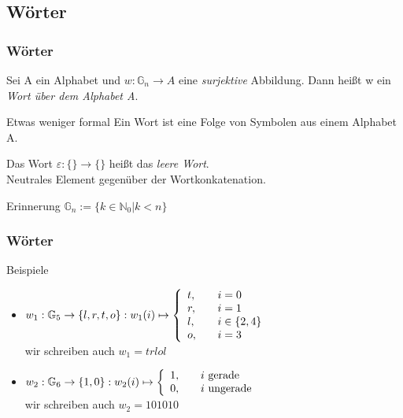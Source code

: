 \subsection{Wörter}
\begin{frame}
  \frametitle{Wörter}
  \begin{definition}
    Sei A ein Alphabet und $w: \mathbb{G}_n \rightarrow A$ eine \emph{surjektive} Abbildung. Dann heißt w ein \emph{Wort über dem Alphabet A}.
  \end{definition}\pause
  \begin{alertblock}{Etwas weniger formal}
    Ein Wort ist eine Folge von Symbolen aus einem Alphabet A.
  \end{alertblock}\pause
  \begin{definition}
    Das Wort $\varepsilon: \{\} \rightarrow \{\}$ heißt das \emph{leere Wort}. \\
    {\tiny Neutrales Element gegenüber der Wortkonkatenation.}
  \end{definition}\pause
  \begin{alertblock}{Erinnerung}
    $\mathbb{G}_n :=  \{k \in \mathbb{N}_0 | k < n\}$
  \end{alertblock}
\end{frame}
\begin{frame}
  \frametitle{Wörter}
  \begin{exampleblock}{Beispiele}
    \begin{itemize}
      \item
      $
        w_1: \mathbb{G}_5 \rightarrow \{l, r, t, o\}: w_1(i) \mapsto \left\{
        \begin{array}{l l}
          t, & \quad i = 0\\
          r, & \quad i = 1\\
          l, & \quad i \in \{2, 4\}\\
          o, & \quad i = 3\\
        \end{array} \right.
      $ \\
      wir schreiben auch $w_1 = trlol$
      \item
      $
        w_2: \mathbb{G}_6 \rightarrow \{1, 0\}: w_2(i) \mapsto \left\{
        \begin{array}{l l}
          1, & \quad \text{$i$ gerade}\\
          0, & \quad \text{$i$ ungerade}\\
        \end{array} \right.
      $ \\
      wir schreiben auch $w_2 = 101010$
    \end{itemize}
  \end{exampleblock}
\end{frame}
